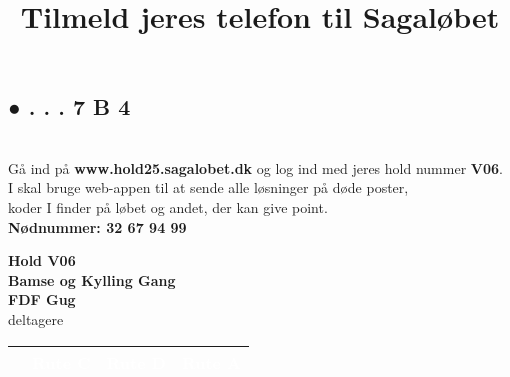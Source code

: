 \subsection{\textcolor{søblå}{● . . . 7 B 4}}
\newpage
\title{Tilmeld jeres telefon til Sagaløbet}\\
{\fontsize{15}{36}\selectfont
Gå ind på \textbf{www.hold25.sagalobet.dk} og log ind med jeres hold nummer \textbf{V06}.\\
I skal bruge web-appen til at sende alle løsninger på døde poster,\\
koder I finder på løbet og andet, der kan give point.\\
\textbf{\textcolor{efterårsrød}{Nødnummer: 32 67 94 99}}\\
}
\begin{center}
{\fontsize{140}{60}\selectfont\textbf{Hold \textcolor{søblå}{V06}}\\}
{\fontsize{30}{50}\selectfont\textbf{\textcolor{søblå}{Bamse og Kylling Gang}}\\}
{\fontsize{20}{50}\selectfont\textbf{FDF Gug}\\}
{\fontsize{20}{40} deltagere\\}
{\vspace{0,5cm}}

\begin{tabular}{|>{\centering\arraybackslash}p{3cm}|
                >{\centering\arraybackslash}p{3cm}|
                >{\centering\arraybackslash}p{3cm}|
                >{\centering\arraybackslash}p{3cm}|}
\hline
\cellcolor{søblå}\textbf{\textcolor{white}{\rule{0pt}{3cm}Rute B}} &
\cellcolor{korngul}\textbf{\textcolor{white}{Rute C}} &
\cellcolor{græsgrøn}\textbf{\textcolor{white}{Rute D}} &
\cellcolor{efterårsrød}\textbf{\textcolor{white}{Rute A}} \\
\hline
\end{tabular}\\
\end{center}
\vspace{-19.1cm}
